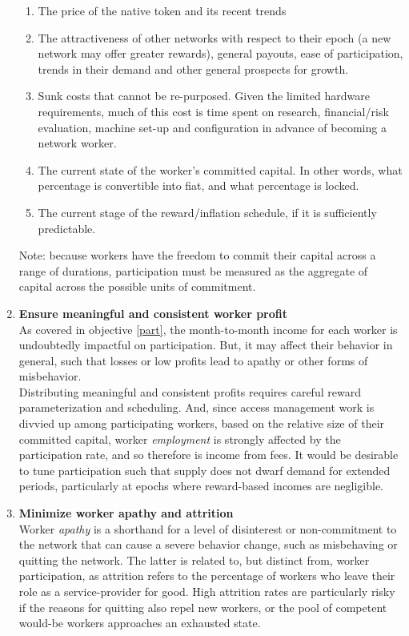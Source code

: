 \documentclass[11pt]{amsart}
\begin{document}
\begin{enumerate}
\begin{enumerate}
   \item The price of the native token and its recent trends
   \item The attractiveness of other networks with respect to their epoch (a new network may offer greater rewards), general payouts, ease of participation, trends in their demand and other general prospects for growth. 
   \item Sunk costs that cannot be re-purposed. Given the limited hardware requirements, much of this cost is time spent on research, financial/risk evaluation, machine set-up and configuration in advance of becoming a network worker. 
   \item The current state of the worker's committed capital. In other words, what percentage is convertible into fiat, and what percentage is locked.
   \item The current stage of the reward/inflation schedule, if it is sufficiently predictable. 
   \end{enumerate}
   Note: because workers have the freedom to commit their capital across a range of durations, participation must be measured as the aggregate of capital across the possible units of commitment.
   \\
   \item \textbf{Ensure meaningful and consistent worker profit}\label{profit}
   \\
   As covered in objective \ref{part}, the month-to-month income for each worker is undoubtedly impactful on participation. But, it may affect their behavior in general, such that losses or low profits lead to apathy or other forms of misbehavior.
   \\
   Distributing meaningful and consistent profits requires careful reward parameterization and scheduling. And, since access management work is divvied up among participating workers, based on the relative size of their committed capital, worker \textit{employment} is strongly affected by the participation rate, and so therefore is income from fees. It would be desirable to tune participation such that supply does not dwarf demand for extended periods, particularly at epochs where reward-based incomes are negligible.
   \\
   \item \textbf{Minimize worker apathy and attrition}\label{attrition}
   \\
   Worker \textit{apathy} is a shorthand for a level of disinterest or non-commitment to the network that can cause a severe behavior change, such as misbehaving or quitting the network. The latter is related to, but distinct from, worker participation, as attrition refers to the percentage of workers who leave their role as a service-provider for good. High attrition rates are particularly risky if the reasons for quitting also repel new workers, or the pool of competent would-be workers approaches an exhausted state.   

\end{enumerate}
\end{document}
